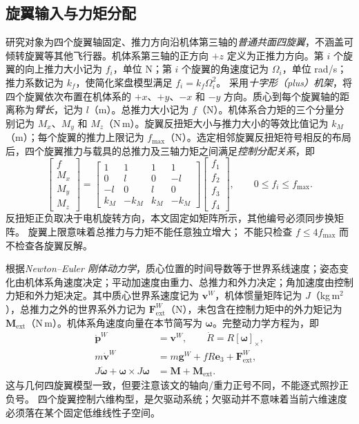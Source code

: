 \documentclass[UTF8,a4paper,fontset=fandol,11pt]{ctexart}
\newcommand{\sk}[1]{[#1]_{\times}}
\newcommand{\e}{\bm e}
\newcommand{\vct}[1]{\bm #1}
\begin{document}
\subsection{旋翼输入与力矩分配}
研究对象为四个旋翼轴固定、推力方向沿机体第三轴的\emph{普通共面四旋翼}，不涵盖可倾转旋翼等其他飞行器。机体系第三轴的正方向 $+z$ 定义为正推力方向。第 $i$ 个旋翼的向上推力大小记为 $f_i$，单位 N；第 $i$ 个旋翼的角速度记为 $\Omega_i$，单位 rad/s；推力系数记为 $k_f$，使简化桨盘模型满足 $f_i=k_f\Omega_i^2$。
采用\emph{十字形（plus）机架}，将四个旋翼依次布置在机体系的 $+x$、$+y$、$-x$ 和 $-y$ 方向。质心到每个旋翼轴的距离称为\emph{臂长}，记为 $l$（m）。总推力大小记为 $f$（N）。机体系合力矩的三个分量分别记为 $M_x$、$M_y$ 和 $M_z$（N\,m）。旋翼反扭矩大小与推力大小的等效比值记为 $k_M$（m）；每个旋翼的推力上限记为 $f_{\max}$（N）。选定相邻旋翼反扭矩符号相反的布局后，四个旋翼推力与载具的总推力及三轴力矩之间满足\emph{控制分配关系}，即
\begin{equation}\label{eq:allocation}
 \begin{bmatrix}f\\M_x\\M_y\\M_z\end{bmatrix}
 =\begin{bmatrix}
 1&1&1&1\\0&l&0&-l\\-l&0&l&0\\k_M&-k_M&k_M&-k_M
 \end{bmatrix}
 \begin{bmatrix}f_1\\f_2\\f_3\\f_4\end{bmatrix},\qquad
 0\le f_i\le f_{\max}.
\end{equation}
反扭矩正负取决于电机旋转方向，本文固定如矩阵所示，其他编号必须同步换矩阵。
旋翼上限意味着总推力与力矩不能任意独立增大；
不能只检查 $f\le4f_{\max}$ 而不检查各旋翼反解。

根据\emph{Newton--Euler 刚体动力学}，质心位置的时间导数等于世界系线速度；姿态变化由机体系角速度决定；平动加速度由重力、总推力和外力决定；角加速度由控制力矩和外力矩决定。其中质心世界系速度记为 $\vct v^W$，机体惯量矩阵记为 $J$（kg\,m$^2$），总推力之外的世界系外力记为 $\vct F_{\mathrm{ext}}^W$（N），未包含在控制力矩中的外力矩记为 $\vct M_{\mathrm{ext}}$（N\,m）。机体系角速度向量在本节简写为 $\vct\omega$。完整动力学方程为，即
\begin{align}
 \dot{\vct p}^W&=\vct v^W,\qquad \dot R=R\sk{\vct\omega},\\
 m\dot{\vct v}^W&=m\vct g^W+fR\e_3+\vct F_{\mathrm{ext}}^W,\label{eq:quadtrans}\\
 J\dot{\vct\omega}+\vct\omega\times J\vct\omega
 &=\vct M+\vct M_{\mathrm{ext}}.\label{eq:quadrot}
\end{align}
这与几何四旋翼模型\cite{lee}一致，但要注意该文的轴向/重力正号不同，不能逐式照抄正负号。
四个旋翼控制六维构型，是欠驱动系统；欠驱动并不意味着当前六维速度必须落在某个固定低维线性子空间。
\end{document}
